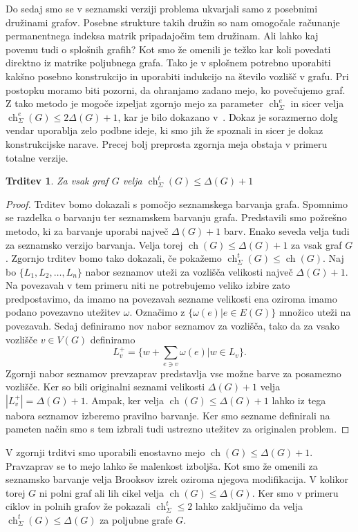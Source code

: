 \documentclass[12pt,a4paper,twoside]{article}
\theoremstyle{definition} %
\theoremstyle{plain} %
\newtheorem{trditev}[definicija]{Trditev}
\numberwithin{equation}{section}  %
\DeclareMathOperator{\ch}{ch}
\begin{document}
Do sedaj smo se v seznamski verziji problema ukvarjali samo z posebnimi družinami grafov. Posebne strukture takih družin so nam omogočale računanje permanentnega indeksa matrik pripadajočim tem družinam. Ali lahko kaj povemu tudi o splošnih grafih? Kot smo že omenili je težko kar koli povedati direktno iz matrike poljubnega grafa. Tako je v splošnem potrebno uporabiti kakšno posebno konstrukcijo in uporabiti indukcijo na število vozlišč v grafu. Pri postopku moramo biti pozorni, da ohranjamo zadano mejo, ko povečujemo graf. Z tako metodo je mogoče izpeljat zgornjo mejo za parameter $\ch_{\Sigma}^e$ in sicer velja $\ch_{\Sigma}^e(G) \le 2 \Delta(G) + 1$, kar je bilo dokazano v~\cite{listbounds}. Dokaz je sorazmerno dolg vendar uporablja zelo podbne ideje, ki smo jih že spoznali in sicer je dokaz konstrukcijske narave. Precej bolj preprosta zgornja meja obstaja v primeru totalne verzije.
\begin{trditev}
Za vsak graf $G$ velja $\ch_{\Sigma}^t(G) \le  \Delta(G) + 1$
\end{trditev}
\begin{proof}
Trditev bomo dokazali s pomočjo seznamskega barvanja grafa. Spomnimo se razdelka o barvanju ter seznamskem barvanju grafa. Predstavili smo požrešno metodo, ki za barvanje uporabi največ $\Delta(G) + 1$ barv. Enako seveda velja tudi za seznamsko verzijo barvanja. Velja torej $\ch(G) \le \Delta(G) +1$ za vsak graf $G$. Zgornjo trditev bomo tako dokazali, če pokažemo $\ch_{\Sigma}^t(G) \le \ch(G)$.
Naj bo $\{L_1, L_2, \ldots, L_n\}$ nabor seznamov uteži za vozlišča velikosti največ $\Delta(G) + 1$. Na povezavah v tem primeru niti ne potrebujemo veliko izbire zato predpostavimo, da imamo na povezavah sezname velikosti ena oziroma imamo podano povezavno utežitev $\omega$. Označimo z $\{\omega(e) | e \in E(G)\}$ množico uteži na povezavah. Sedaj definiramo nov nabor seznamov za vozlišča, tako da za vsako vozlišče $v \in V(G)$ definiramo
$$L_{v}^+ = \{ w + \sum_{e\ni v} \omega(e) | w \in L_v\}. $$
Zgornji nabor seznamov prevzaprav predstavlja vse možne barve za posamezno vozlišče. Ker so bili originalni seznami velikosti $\Delta(G) + 1$ velja $|L_{v}^+| =\Delta(G) + 1$. Ampak, ker velja $\ch(G) \le \Delta(G) +1$ lahko iz tega nabora seznamov izberemo pravilno barvanje. Ker smo sezname definirali na pameten način smo s tem izbrali tudi ustrezno utežitev za originalen problem.
\end{proof}
V zgornji trditvi smo uporabili enostavno mejo $\ch(G) \le \Delta(G) + 1$. Pravzaprav se to mejo lahko še malenkost izboljša. Kot smo že omenili za seznamsko barvanje velja Brooksov izrek oziroma njegova modifikacija. V kolikor torej $G$ ni polni graf ali lih cikel velja $\ch(G) \le \Delta(G)$. Ker smo v primeru ciklov in polnih grafov že pokazali $\ch_{\Sigma}^t \le 2$ lahko zaključimo da velja $\ch_{\Sigma}^t(G) \le \Delta(G)$ za poljubne grafe $G$.
\end{document}
